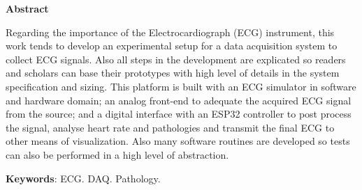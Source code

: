 \begin{center}
\textbf{\Large Abstract}
\end{center}

Regarding the importance of the Electrocardiograph (ECG) instrument, this work tends to develop an experimental setup for a data acquisition system to collect ECG signals. Also all steps in the development are explicated so readers and scholars can base their prototypes with high level of details in the system specification and sizing. This platform is built with an ECG simulator in software and hardware domain; an analog front-end to adequate the acquired ECG signal from the source; and a digital interface with an ESP32 controller to post process the signal, analyse heart rate and pathologies and transmit the final ECG to other means of visualization. Also many software routines are developed so tests can also be performed in a high level of abstraction.

\begin{flushleft}
\textbf{Keywords}: ECG. DAQ. Pathology.
\end{flushleft}

\pagebreak

